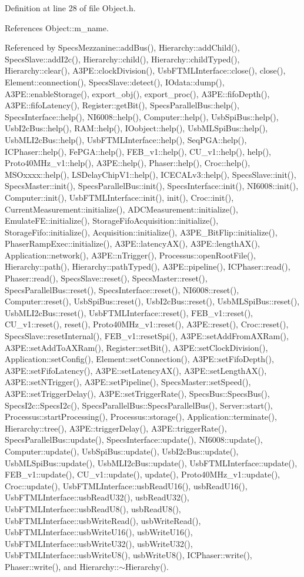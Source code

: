 Definition at line 28 of file Object.h.

References Object::m\_\-name.

Referenced by SpecsMezzanine::addBus(), Hierarchy::addChild(), SpecsSlave::addI2c(), Hierarchy::child(), Hierarchy::childTyped(), Hierarchy::clear(), A3PE::clockDivision(), UsbFTMLInterface::close(), close(), Element::connection(), SpecsSlave::detect(), IOdata::dump(), A3PE::enableStorage(), export\_\-obj(), export\_\-proc(), A3PE::fifoDepth(), A3PE::fifoLatency(), Register::getBit(), SpecsParallelBus::help(), SpecsInterface::help(), NI6008::help(), Computer::help(), UsbSpiBus::help(), UsbI2cBus::help(), RAM::help(), IOobject::help(), UsbMLSpiBus::help(), UsbMLI2cBus::help(), UsbFTMLInterface::help(), SeqPGA::help(), ICPhaser::help(), FePGA::help(), FEB\_\-v1::help(), CU\_\-v1::help(), help(), Proto40MHz\_\-v1::help(), A3PE::help(), Phaser::help(), Croc::help(), MSOxxxx::help(), LSDelayChipV1::help(), ICECALv3::help(), SpecsSlave::init(), SpecsMaster::init(), SpecsParallelBus::init(), SpecsInterface::init(), NI6008::init(), Computer::init(), UsbFTMLInterface::init(), init(), Croc::init(), CurrentMeasurement::initialize(), ADCMeasurement::initialize(), EmulateFE::initialize(), StorageFifoAcquisition::initialize(), StorageFifo::initialize(), Acquisition::initialize(), A3PE\_\-BitFlip::initialize(), PhaserRampExec::initialize(), A3PE::latencyAX(), A3PE::lengthAX(), Application::network(), A3PE::nTrigger(), Processus::openRootFile(), Hierarchy::path(), Hierarchy::pathTyped(), A3PE::pipeline(), ICPhaser::read(), Phaser::read(), SpecsSlave::reset(), SpecsMaster::reset(), SpecsParallelBus::reset(), SpecsInterface::reset(), NI6008::reset(), Computer::reset(), UsbSpiBus::reset(), UsbI2cBus::reset(), UsbMLSpiBus::reset(), UsbMLI2cBus::reset(), UsbFTMLInterface::reset(), FEB\_\-v1::reset(), CU\_\-v1::reset(), reset(), Proto40MHz\_\-v1::reset(), A3PE::reset(), Croc::reset(), SpecsSlave::resetInternal(), FEB\_\-v1::resetSpi(), A3PE::setAddFromAXRam(), A3PE::setAddToAXRam(), Register::setBit(), A3PE::setClockDivision(), Application::setConfig(), Element::setConnection(), A3PE::setFifoDepth(), A3PE::setFifoLatency(), A3PE::setLatencyAX(), A3PE::setLengthAX(), A3PE::setNTrigger(), A3PE::setPipeline(), SpecsMaster::setSpeed(), A3PE::setTriggerDelay(), A3PE::setTriggerRate(), SpecsBus::SpecsBus(), SpecsI2c::SpecsI2c(), SpecsParallelBus::SpecsParallelBus(), Server::start(), Processus::startProcessing(), Processus::storage(), Application::terminate(), Hierarchy::tree(), A3PE::triggerDelay(), A3PE::triggerRate(), SpecsParallelBus::update(), SpecsInterface::update(), NI6008::update(), Computer::update(), UsbSpiBus::update(), UsbI2cBus::update(), UsbMLSpiBus::update(), UsbMLI2cBus::update(), UsbFTMLInterface::update(), FEB\_\-v1::update(), CU\_\-v1::update(), update(), Proto40MHz\_\-v1::update(), Croc::update(), UsbFTMLInterface::usbReadU16(), usbReadU16(), UsbFTMLInterface::usbReadU32(), usbReadU32(), UsbFTMLInterface::usbReadU8(), usbReadU8(), UsbFTMLInterface::usbWriteRead(), usbWriteRead(), UsbFTMLInterface::usbWriteU16(), usbWriteU16(), UsbFTMLInterface::usbWriteU32(), usbWriteU32(), UsbFTMLInterface::usbWriteU8(), usbWriteU8(), ICPhaser::write(), Phaser::write(), and Hierarchy::$\sim$Hierarchy().


